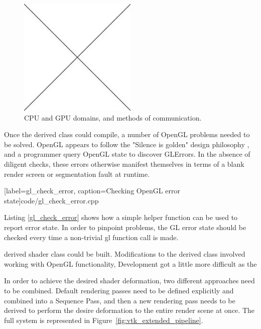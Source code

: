 \documentclass[MSc,paper=a4,pagesize=auto]{icldt}
\begin{document}
\begin{figure}[htbp!]
    \centering
    \includegraphics[width=0.5\textwidth]{resources/placeholder}
    \caption{CPU and GPU domains, and methods of communication.}
    \label{fig:cpu_gpu_domains}
\end{figure}

Once the derived class could compile, a number of OpenGL problems needed to be solved. OpenGL appears to follow the "Silence is golden" design philosophy \cite{the_art_of_unix_programming}, and a programmer query OpenGL state to discover GLErrors. In the absence of diligent checks, these errors otherwise manifest themselves in terms of a blank render screen or segmentation fault at runtime. 


  [label=gl_check_error, caption=Checking OpenGL error state]{code/gl_check_error.cpp}

Listing \ref{gl_check_error} shows how a simple helper function can be used to report error state. In order to pinpoint problems, the GL error state should be checked every time a non-trivial gl function call is made.






derived shader class could be built. Modifications to the derived class involved working with OpenGL functionality,  Development got a little more difficult as the 




In order to achieve the desired shader deformation, two different approaches need to be combined. Default rendering passes need to be defined explicitly and combined into a Sequence Pass, and then a new rendering pass needs to be derived to perform the desire deformation to the entire render scene at once. The full system is represented in Figure~\ref{fig:vtk_extended_pipeline}.
\end{document}
